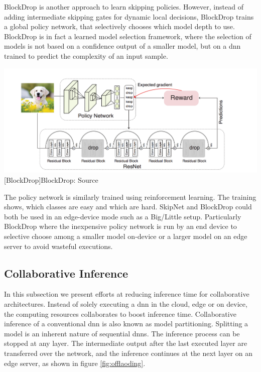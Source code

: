 \begin{enumdescript}
	BlockDrop \cite{wu_blockdrop:_2017} is another approach to learn skipping policies. However, instead of adding intermediate skipping gates for dynamic local decisions, BlockDrop trains a global policy network, that selectively chooses which model depth to use. BlockDrop is in fact a learned model selection framework, where the selection of models is not based on a confidence output of a smaller model, but on a \gls{dnn} trained to predict the complexity of an input sample. 
	
	
	\begin{minipage}[t]{\linewidth}    
		\centering
		\includegraphics[width=\linewidth]{figures/models/blockdrop}
		[BlockDrop]{BlockDrop: Source  \cite{wu_blockdrop:_2017}}
	\end{minipage}
	
	The policy network is similarly trained using reinforcement learning. The training shows, which classes are easy and which are hard. SkipNet and BlockDrop could both be used in an edge-device mode such as a Big/Little \cite{park_big/little_2015} setup. Particularly BlockDrop where the inexpensive policy network is run by an end device to selective choose among a smaller model on-device or a larger model on an edge server to avoid wasteful executions.


\end{enumdescript}

\subsection{Collaborative Inference}

In this subsection we present efforts at reducing inference time for collaborative architectures. Instead of solely executing a \gls{dnn} in the cloud, edge or on device, the computing resources collaborates to boost inference time. Collaborative inference of a conventional \gls{dnn} is also known as model partitioning. Splitting a model is an inherent nature of sequential \gls{dnn}s. The inference process can be stopped at any layer. The intermediate output after the last executed layer are transferred over the network, and the inference continues at the next layer on an edge server, as shown in figure \ref{fig:offlaoding}.


